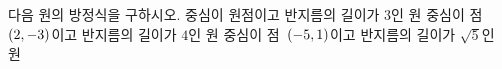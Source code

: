 다음 원의 방정식을 구하시오.
 중심이 원점이고 반지름의 길이가 $3$인 원
 중심이 점~$(2{,}\mkern3mu\mathopen{}-3)$이고 반지름의 길이가 $4$인 원
 중심이 점~$(-5{,}\mkern3mu\mathopen{}1)$이고 반지름의 길이가 $\sqrt{5}$인 원
